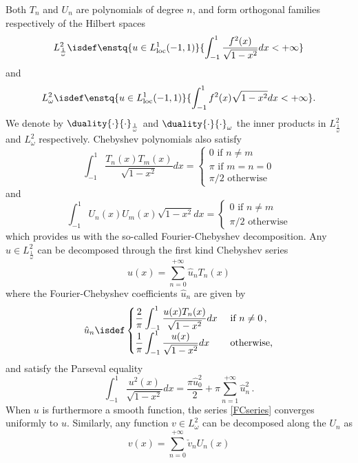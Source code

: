 \documentclass[a4paper]{article}
\begin{document}
	Both $T_n$ and $U_n$ are polynomials of degree $n$, and form orthogonal families respectively of the Hilbert spaces 
	$$L^2_{\frac{1}{\omega}} \isdef \enstq{u \in L^1_\textup{loc}(-1,1)} {\int_{-1}^{1} \dfrac{f^2(x)}{\sqrt{1 - x^2} }dx< + \infty}$$
	and 
	$$L^2_{\omega} \isdef \enstq{u \in L^1_\textup{loc}(-1,1)} {\int_{-1}^{1} {f^2(x)}{\sqrt{1 - x^2} }dx< + \infty}.$$
	We denote by $\duality{\cdot}{\cdot}_\frac{1}{\omega}$ and $\duality{\cdot}{\cdot}_\omega$ the inner products in $L^2_{\frac{1}{\omega}}$ and $L^2_{\omega}$ respectively.
	Chebyshev polynomials also satisfy
	\begin{equation}
	\int_{-1}^1  \dfrac{T_n(x)T_m(x)}{\sqrt{1 - x^2} }dx = \left\{
	\begin{array}{l}
	0 \mbox{ if } n\ne m\\
	\pi \mbox{ if } m=n=0\\
	\pi/2 \mbox{ otherwise}
	\end{array} 
	\right.
	\end{equation}
	and
	\begin{equation}
	\int_{-1}^1  U_n(x)U_m(x)\sqrt{1 - x^2} dx = \left\{
	\begin{array}{l}
	0 \mbox{ if } n\ne m\\
	\pi/2 \mbox{ otherwise}
	\end{array} 
	\right.
	\end{equation}
	which provides us with the so-called Fourier-Chebyshev decomposition. Any
	$u\in L^2_{\frac{1}{\omega}}$ can be decomposed through the first kind Chebyshev series 
	\begin{equation}
	u(x) = \sum_{n=0}^{+\infty} \hat{u}_n T_n(x)
	\label{FCseries}
	\end{equation}
	where the Fourier-Chebyshev coefficients $\hat{u}_n$ are given by 
	\[ \hat{u}_n \isdef \begin{cases}
	\dfrac{2}{\pi}\displaystyle\int_{-1}^{1} \dfrac{u(x) T_n(x)}{\sqrt{1-x^2}}dx & \text{ if } n \neq 0\,,\\
	\dfrac{1}{\pi}\displaystyle\int_{-1}^{1} \dfrac{u(x)}{\sqrt{1-x^2}}dx & \text{ otherwise,}\\
	\end{cases}\]
	and satisfy the Parseval equality
	\[ \int_{-1}^{1} \frac{u^2(x)}{\sqrt{1-x^2}} dx =  \frac{\pi \hat{u}_0^2}{2} + \pi\sum_{n=1}^{+\infty}\hat{u}_n^2\,.\]
	When $u$ is furthermore a smooth function, the series \eqref{FCseries} converges uniformly to $u$. Similarly, any 
	function $v\in L^2_{\omega}$ can be decomposed along the $U_n$ as
	\[ v(x) = \sum_{n=0}^{+\infty} \check{v}_n U_n(x)\]
\end{document}
